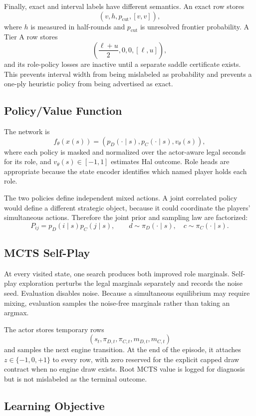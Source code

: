 \documentclass[11pt]{article}
\begin{document}
Finally, exact and interval labels have different semantics. An exact row stores
\[
(v,h,p_{\mathrm{cut}},[v,v]),
\]
where \(h\) is measured in half-rounds and \(p_{\mathrm{cut}}\) is unresolved
frontier probability. A Tier A row stores
\[
\left(\frac{\ell+u}{2},0,0,[\ell,u]\right),
\]
and its role-policy losses are inactive until a separate saddle certificate
exists. This prevents interval width from being mislabeled as probability and
prevents a one-ply heuristic policy from being advertised as exact.

\subsection{Policy/Value Function}

The network is
\[
f_{\theta}(x(s))=
\left(p_D(\cdot\mid s),p_C(\cdot\mid s),v_{\theta}(s)\right),
\]
where each policy is masked and normalized over the actor-aware legal seconds
for its role, and \(v_{\theta}(s)\in[-1,1]\) estimates Hal outcome. Role heads
are appropriate because the state encoder identifies which named player holds
each role.

The two policies define independent mixed actions. A joint correlated policy
would define a different strategic object, because it could coordinate the
players' simultaneous actions. Therefore the joint prior and sampling law are
factorized:
\[
P_{ij}=p_D(i\mid s)p_C(j\mid s),
\qquad
d\sim\pi_D(\cdot\mid s),
\quad
c\sim\pi_C(\cdot\mid s).
\]

\subsection{MCTS Self-Play}

At every visited state, one search produces both improved role marginals.
Self-play exploration perturbs the legal marginals separately and records the
noise seed. Evaluation disables noise. Because a simultaneous equilibrium may
require mixing, evaluation samples the noise-free marginals rather than taking
an argmax.

The actor stores temporary rows
\[
(s_t,\pi_{D,t},\pi_{C,t},m_{D,t},m_{C,t})
\]
and samples the next engine transition. At the end of the episode, it attaches
\(z\in\{-1,0,+1\}\) to every row, with zero reserved for the explicit capped
draw contract when no engine draw exists. Root MCTS value is logged for
diagnosis but is not mislabeled as the terminal outcome.

\subsection{Learning Objective}
\end{document}
